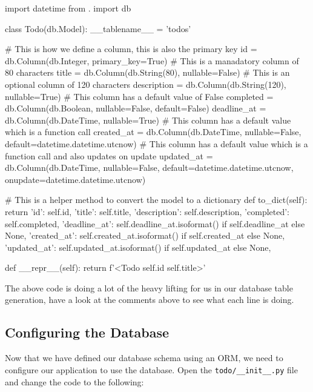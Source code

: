 \documentclass{csse4400}
\begin{document}
\begin{code}[language=python,numbers=none]{}
import datetime
from . import db

class Todo(db.Model):
    __tablename__ = 'todos'

    # This is how we define a column, this is also the primary key
    id = db.Column(db.Integer, primary_key=True)
    # This is a manadatory column of 80 characters
    title = db.Column(db.String(80), nullable=False)
    # This is an optional column of 120 characters
    description = db.Column(db.String(120), nullable=True)
    # This column has a default value of False
    completed = db.Column(db.Boolean, nullable=False, default=False)
    deadline_at = db.Column(db.DateTime, nullable=True)
    # This column has a default value which is a function call
    created_at = db.Column(db.DateTime, nullable=False, default=datetime.datetime.utcnow)
    # This column has a default value which is a function call and also updates on update
    updated_at = db.Column(db.DateTime, nullable=False, default=datetime.datetime.utcnow, onupdate=datetime.datetime.utcnow)
    
    # This is a helper method to convert the model to a dictionary
    def to_dict(self):
        return {
            'id': self.id,
            'title': self.title,
            'description': self.description,
            'completed': self.completed,
            'deadline_at': self.deadline_at.isoformat() if self.deadline_at else None,
            'created_at': self.created_at.isoformat() if self.created_at else None,
            'updated_at': self.updated_at.isoformat() if self.updated_at else None,
        }

    def __repr__(self):
        return f'<Todo {self.id} {self.title}>'
\end{code}

The above code is doing a lot of the heavy lifting for us in our database table generation,
have a look at the comments above to see what each line is doing.


\subsection{Configuring the Database}

Now that we have defined our database schema using an ORM,
we need to configure our application to use the database.
Open the \texttt{todo/\_\_init\_\_.py} file and change the code to the following:
\end{document}
